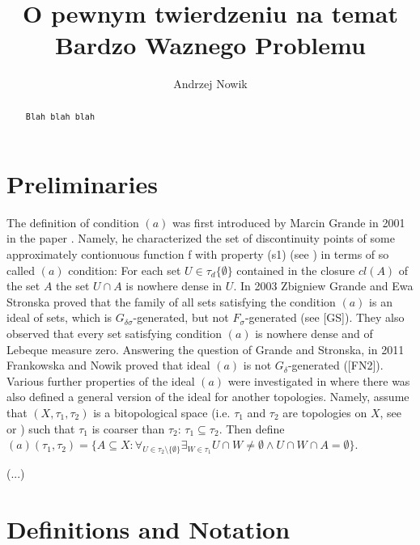 \documentclass[12pt]{amsart}
\author{Andrzej Nowik}
\theoremstyle{plain}
\theoremstyle{definition}
\theoremstyle{remark}
\newcommand{\cl}{\mathit{cl}}
\newcommand{\dummy}{{\tt Blah blah blah}}
\newcommand{\aideal}{\mathit{(a)}}
\newcommand{\topWithoutEmptyset}[1]{#1\setminus\lbrace\emptyset\rbrace}
\begin{document}
\title[
O pewnym twierdzeniu...
]{
O pewnym twierdzeniu na temat Bardzo Waznego Problemu
}

\begin{abstract}
\dummy
\end{abstract}

\maketitle

\section{Preliminaries}
The definition of condition $(a)$ was first introduced by Marcin Grande in 2001 in the paper
\cite{MarcinGrande}. Namely, he characterized the set of discontinuity points of some approximately contionuous function f with property
(s1) (see \cite{MarcinGrande}) in terms of so called $(a)$ condition:
For each set $U\in\tau_d\lbrace\emptyset\rbrace$ contained in the closure $\cl(A)$ of the set $A$ the
set $U \cap A$ is nowhere dense in $U$.
In 2003 Zbigniew Grande and Ewa Stronska proved that the family of all sets satisfying
the condition $(a)$ is an ideal of sets, which is $G_{\delta\sigma}$-generated, but not 
$F_{\sigma}$-generated 
(see [GS]). They also observed that every set satisfying condition $(a)$ is nowhere dense
and of Lebeque measure zero. Answering the question of Grande and Stronska,
in 2011 Frankowska and Nowik proved that ideal $(a)$ is not $G_{\delta}$-generated ([FN2]).
Various further properties of the ideal $(a)$ were investigated in \cite{N}
where there was also defined a general version of the ideal for another
topologies. Namely, assume
that $(X, \tau_1,\tau_2)$ is a bitopological space 
(i.e. $\tau_1$ and $\tau_2$ are topologies on $X$, 
see \cite{D} or )
such that $\tau_1$ is coarser than $\tau_2$:
$\tau_1 \subseteq \tau_2$. Then 
define $\aideal(\tau_1, \tau_2) = \{ A \subseteq X \colon
\forall_{U \in \topWithoutEmptyset{\tau_2}}
\exists_{W \in \tau_1} U \cap W \not= \emptyset \wedge
U \cap W \cap A = \emptyset\}$.

(...)

\section{Definitions and Notation}
\end{document}
